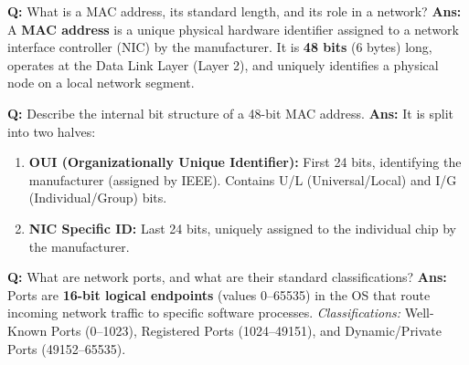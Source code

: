 \documentclass[10pt,a4paper,twocolumn]{article}
\begin{document}
\begin{tcolorbox}[
  colback=white,
  colframe=UnitColorThree,
  colbacktitle=gray!10!white,
  coltitle=black,
  fonttitle=\bfseries\sffamily\small,
  title={Unit III $\bullet$ Card 10},
  boxrule=1.2pt,
  arc=2mm,
  outer arc=2mm,
  boxsep=1.5mm,
  top=1mm,
  bottom=1mm,
  left=1.5mm,
  right=1.5mm,
  before skip=2.5mm,
  after skip=2.5mm
]
\textbf{Q:} What is a MAC address, its standard length, and its role in a network?
\tcbline
\textbf{Ans:} A \textbf{MAC address} is a unique physical hardware identifier assigned to a network interface controller (NIC) by the manufacturer. It is \textbf{48 bits} (6 bytes) long, operates at the Data Link Layer (Layer 2), and uniquely identifies a physical node on a local network segment.
\end{tcolorbox}


\begin{tcolorbox}[
  colback=white,
  colframe=UnitColorThree,
  colbacktitle=gray!10!white,
  coltitle=black,
  fonttitle=\bfseries\sffamily\small,
  title={Unit III $\bullet$ Card 11},
  boxrule=1.2pt,
  arc=2mm,
  outer arc=2mm,
  boxsep=1.5mm,
  top=1mm,
  bottom=1mm,
  left=1.5mm,
  right=1.5mm,
  before skip=2.5mm,
  after skip=2.5mm
]
\textbf{Q:} Describe the internal bit structure of a 48-bit MAC address.
\tcbline
\textbf{Ans:} It is split into two halves:
\begin{enumerate}
  \item \textbf{OUI (Organizationally Unique Identifier):} First 24 bits, identifying the manufacturer (assigned by IEEE). Contains U/L (Universal/Local) and I/G (Individual/Group) bits.
  \item \textbf{NIC Specific ID:} Last 24 bits, uniquely assigned to the individual chip by the manufacturer.
\end{enumerate}
\end{tcolorbox}


\begin{tcolorbox}[
  colback=white,
  colframe=UnitColorThree,
  colbacktitle=gray!10!white,
  coltitle=black,
  fonttitle=\bfseries\sffamily\small,
  title={Unit III $\bullet$ Card 12},
  boxrule=1.2pt,
  arc=2mm,
  outer arc=2mm,
  boxsep=1.5mm,
  top=1mm,
  bottom=1mm,
  left=1.5mm,
  right=1.5mm,
  before skip=2.5mm,
  after skip=2.5mm
]
\textbf{Q:} What are network ports, and what are their standard classifications?
\tcbline
\textbf{Ans:} Ports are \textbf{16-bit logical endpoints} (values 0–65535) in the OS that route incoming network traffic to specific software processes.  
\textit{Classifications:} Well-Known Ports (0–1023), Registered Ports (1024–49151), and Dynamic/Private Ports (49152–65535).
\end{tcolorbox}
\end{document}

